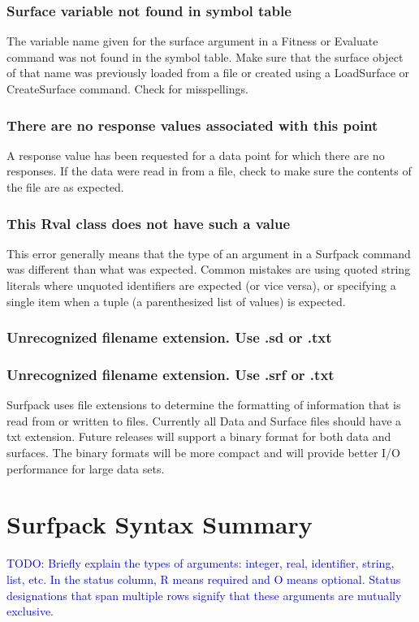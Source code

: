 \documentclass{article}
\begin{document}
\subsubsection{Surface variable not found in symbol table}
The variable name given for the surface argument in a Fitness or Evaluate
command was not found in the symbol table.  Make sure that the surface object of
that name was previously loaded from a file or created using a LoadSurface or
CreateSurface command.  Check for misspellings.
\subsubsection{There are no response values associated with this point}
A response value has been requested for a data point for which there are no
responses.  If the data were read in from a file, check to make sure the
contents of the file are as expected.

\subsubsection{This Rval class does not have such a value}
This error generally means that the type of an argument in a Surfpack command
was different than what was expected.  Common mistakes are using quoted string
literals where unquoted identifiers are expected (or vice versa), or specifying
a single item when a tuple (a parenthesized list of values) is expected.

\subsubsection{Unrecognized filename extension.  Use .sd or .txt}
\subsubsection{ Unrecognized filename extension.  Use .srf or .txt}
Surfpack uses file extensions to determine the formatting of information that is
read from or written to files.  Currently all Data and Surface files should have
a txt extension.  Future releases will support a binary format for both data and
surfaces.  The binary formats will be more compact and will provide better I/O
performance for large data sets.

\appendix

\section{Surfpack Syntax Summary}
\textcolor{blue}{TODO: Briefly explain the types of arguments: integer, real, identifier, string, list, etc.  In the status column, R means required and O means optional.  Status designations that span multiple rows signify that these arguments are mutually exclusive.}
\end{document}
